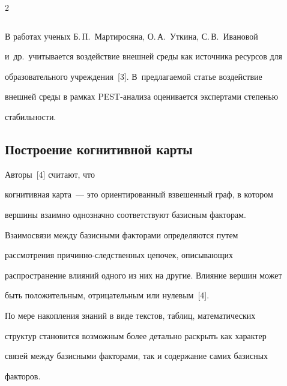 \begin{multicols}{2}
\begin{table}
\begin{center}
\begin{tabular}{|c|l|l|c|}
\end{tabular}


\end{center}


\end{table}





    


    В работах ученых Б.\,П.~Мартиросяна, О.\,А.~Уткина, С.\,В.~Ивановой 


и~др.\ учитывается воздействие внешней среды как источника ресурсов для 


образовательного учреждения~[3]. В~предлагаемой статье воздействие 


внешней среды в рамках PEST-ана\-ли\-за оценивается экспертами степенью 


стабильности. 








    


     \subsection{Построение когнитивной карты}


     


Авторы~[4] считают, что 


когнитивная карта~--- это ориентированный взвешенный граф, в котором 


вершины взаимно однозначно соответствуют базисным факторам. 


Взаимосвязи между базисными факторами определяются путем 


рассмотрения при\-чин\-но-след\-ст\-вен\-ных цепочек, описывающих 


распространение влияний одного из них на другие. Влияние вершин может 


быть положительным, отрицательным или нулевым~[4]. 


     


     По мере накопления знаний в виде текстов, таб\-лиц, математических 


структур становится возможным более детально раскрыть как характер 


связей между базисными факторами, так и содержание самих базисных 


факторов.   



\end{multicols}

